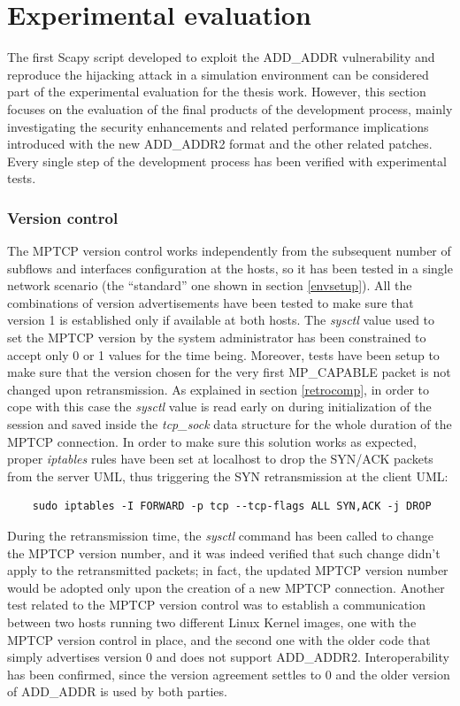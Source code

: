 \section{Experimental evaluation}
\label{exp}
The first Scapy script developed to exploit the ADD\_ADDR vulnerability and reproduce the hijacking attack in a simulation environment can be considered part of the experimental evaluation for the thesis work. However, this section focuses on the evaluation of the final products of the development process, mainly investigating the security enhancements and related performance implications introduced with the new ADD\_ADDR2 format and the other related patches.
Every single step of the development process has been verified with experimental tests.

\subsubsection{Version control}
The MPTCP version control works independently from the subsequent number of subflows and interfaces configuration at the hosts, so it has been tested in a single network scenario (the ``standard'' one shown in section \ref{envsetup}). All the combinations of version advertisements have been tested to make sure that version 1 is established only if available at both hosts. The \textit{sysctl} value used to set the MPTCP version by the system administrator has been constrained to accept only 0 or 1 values for the time being. Moreover, tests have been setup to make sure that the version chosen for the very first MP\_CAPABLE packet is not changed upon retransmission. As explained in section \ref{retrocomp}, in order to cope with this case the \textit{sysctl} value is read early on during initialization of the session and saved inside the \textit{tcp\_sock} data structure for the whole duration of the MPTCP connection. In order to make sure this solution works as expected, proper \textit{iptables} rules have been set at localhost to drop the SYN/ACK packets from the server UML, thus triggering the SYN retransmission at the client UML:

\begin{verbatim}
	sudo iptables -I FORWARD -p tcp --tcp-flags ALL SYN,ACK -j DROP
\end{verbatim}

During the retransmission time, the \textit{sysctl} command has been called to change the MPTCP version number, and it was indeed verified that such change didn't apply to the retransmitted packets; in fact, the updated MPTCP version number would be adopted only upon the creation of a new MPTCP connection.
Another test related to the MPTCP version control was to establish a communication between two hosts running two different Linux Kernel images, one with the MPTCP version control in place, and the second one with the older code that simply advertises version 0 and does not support ADD\_ADDR2. Interoperability has been confirmed, since the version agreement settles to 0 and the older version of ADD\_ADDR is used by both parties.

